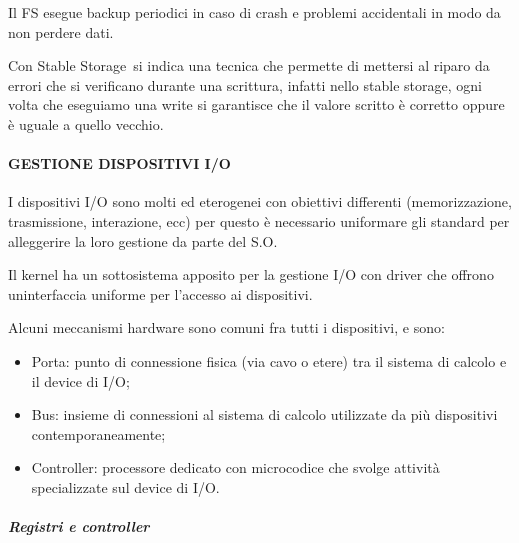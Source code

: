 \documentclass[
]{article}
\providecommand{\tightlist}{%
  \setlength{\itemsep}{0pt}\setlength{\parskip}{0pt}}
\begin{document}
{Il FS esegue backup periodici in caso di crash e problemi accidentali
in modo da non perdere dati.}

{}

{Con }{Stable Storage}{~si indica una tecnica che permette di mettersi
al riparo da errori che si verificano durante una scrittura, infatti
nello stable storage, ogni volta che eseguiamo una write si garantisce
che il valore scritto è corretto oppure è uguale a quello vecchio.}

{}

{}

\paragraph{\texorpdfstring{{GESTIONE DISPOSITIVI
I/O}}{GESTIONE DISPOSITIVI I/O}}\label{h.5y5jh9u1pu1e}

{I dispositivi I/O sono molti ed eterogenei con obiettivi differenti
(memorizzazione, trasmissione, interazione, ecc) per questo è necessario
uniformare gli standard per alleggerire la loro gestione da parte del
S.O.}

{Il kernel ha un sottosistema apposito per la gestione I/O con driver
che offrono un\textquotesingle interfaccia uniforme per l'accesso ai
dispositivi.}

{Alcuni meccanismi hardware sono comuni fra tutti i dispositivi, e
sono:}

{}

\begin{itemize}
\tightlist
\item
  {Porta: punto di connessione fisica (via cavo o etere) tra il sistema
  di calcolo e il device di I/O;}
\end{itemize}

{}

\begin{itemize}
\tightlist
\item
  {Bus: insieme di connessioni al sistema di calcolo utilizzate da più
  dispositivi contemporaneamente;}
\end{itemize}

{}

\begin{itemize}
\tightlist
\item
  {Controller: processore dedicato con microcodice che svolge attività
  specializzate sul device di I/O.}
\end{itemize}

{}

\subparagraph{\texorpdfstring{{Registri e
controller}}{Registri e controller}}\label{h.5zn0ct36eqin}
\end{document}
